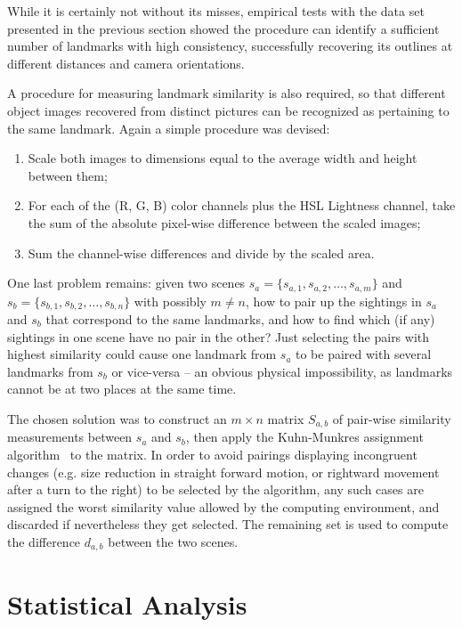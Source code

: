 \documentclass[twocolumn, 9pt]{jsproceedings}
\begin{document}
While it is certainly not without its misses, empirical tests with the data set presented in the previous section showed the procedure can identify a sufficient number of landmarks with high consistency, successfully recovering its outlines at different distances and camera orientations.

A procedure for measuring landmark similarity is also required, so that different object images recovered from distinct pictures can be recognized as pertaining to the same landmark. Again a simple procedure was devised:

\begin{enumerate}
\item Scale both images to dimensions equal to the average width and height between them;
\item For each of the (R, G, B) color channels plus the HSL Lightness channel, take the sum of the absolute pixel-wise difference between the scaled images;
\item Sum the channel-wise differences and divide by the scaled area.
\end{enumerate}

One last problem remains: given two scenes \(s_a = \{s_{a,1}, s_{a,2}, \dotsc, s_{a,m}\}\) and \(s_b = \{s_{b,1}, s_{b,2}, \dotsc, s_{b,n}\}\) with possibly \(m \neq n\), how to pair up the sightings in \(s_a\) and \(s_b\) that correspond to the same landmarks, and how to find which (if any) sightings in one scene have no pair in the other? Just selecting the pairs with highest similarity could cause one landmark from \(s_a\) to be paired with several landmarks from \(s_b\) or vice-versa -- an obvious physical impossibility, as landmarks cannot be at two places at the same time.

The chosen solution was to construct an \(m \times n\) matrix \(S_{a,b}\) of pair-wise similarity measurements between \(s_a\) and \(s_b\), then apply the Kuhn-Munkres assignment algorithm~\cite{kuhn55} to the matrix. In order to avoid pairings displaying incongruent changes (e.g. size reduction in straight forward motion, or rightward movement after a turn to the right) to be selected by the algorithm, any such cases are assigned the worst similarity value allowed by the computing environment, and discarded if nevertheless they get selected. The remaining set is used to compute the difference \(d_{a,b}\) between the two scenes.

\section{Statistical Analysis}
\end{document}
